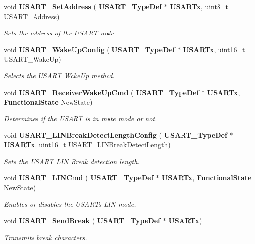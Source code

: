 \begin{DoxyCompactItemize}
void \textbf{ U\+S\+A\+R\+T\+\_\+\+Set\+Address} (\textbf{ U\+S\+A\+R\+T\+\_\+\+Type\+Def} $\ast$\textbf{ U\+S\+A\+R\+Tx}, uint8\+\_\+t U\+S\+A\+R\+T\+\_\+\+Address)
\begin{DoxyCompactList}\small\item\em Sets the address of the U\+S\+A\+RT node. \end{DoxyCompactList}\item 
void \textbf{ U\+S\+A\+R\+T\+\_\+\+Wake\+Up\+Config} (\textbf{ U\+S\+A\+R\+T\+\_\+\+Type\+Def} $\ast$\textbf{ U\+S\+A\+R\+Tx}, uint16\+\_\+t U\+S\+A\+R\+T\+\_\+\+Wake\+Up)
\begin{DoxyCompactList}\small\item\em Selects the U\+S\+A\+RT Wake\+Up method. \end{DoxyCompactList}\item 
void \textbf{ U\+S\+A\+R\+T\+\_\+\+Receiver\+Wake\+Up\+Cmd} (\textbf{ U\+S\+A\+R\+T\+\_\+\+Type\+Def} $\ast$\textbf{ U\+S\+A\+R\+Tx}, \textbf{ Functional\+State} New\+State)
\begin{DoxyCompactList}\small\item\em Determines if the U\+S\+A\+RT is in mute mode or not. \end{DoxyCompactList}\item 
void \textbf{ U\+S\+A\+R\+T\+\_\+\+L\+I\+N\+Break\+Detect\+Length\+Config} (\textbf{ U\+S\+A\+R\+T\+\_\+\+Type\+Def} $\ast$\textbf{ U\+S\+A\+R\+Tx}, uint16\+\_\+t U\+S\+A\+R\+T\+\_\+\+L\+I\+N\+Break\+Detect\+Length)
\begin{DoxyCompactList}\small\item\em Sets the U\+S\+A\+RT L\+IN Break detection length. \end{DoxyCompactList}\item 
void \textbf{ U\+S\+A\+R\+T\+\_\+\+L\+I\+N\+Cmd} (\textbf{ U\+S\+A\+R\+T\+\_\+\+Type\+Def} $\ast$\textbf{ U\+S\+A\+R\+Tx}, \textbf{ Functional\+State} New\+State)
\begin{DoxyCompactList}\small\item\em Enables or disables the U\+S\+A\+RT\textquotesingle{}s L\+IN mode. \end{DoxyCompactList}\item 
void \textbf{ U\+S\+A\+R\+T\+\_\+\+Send\+Break} (\textbf{ U\+S\+A\+R\+T\+\_\+\+Type\+Def} $\ast$\textbf{ U\+S\+A\+R\+Tx})
\begin{DoxyCompactList}\small\item\em Transmits break characters. \end{DoxyCompactList}\item 

\end{DoxyCompactItemize}
